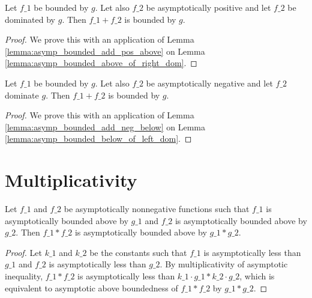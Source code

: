 \begin{lemma}
    \label{lemma:asymp_bounded_add_pos_right_dom}
    \leanok
    Let $f\_1$ be bounded by $g$. Let also $f\_2$ be asymptotically positive and
    let $f\_2$ be dominated by $g$. Then $f\_1 + f\_2$ is bounded by $g$.
\end{lemma}

\begin{proof}
    \leanok
    We prove this with an application of Lemma \ref{lemma:asymp_bounded_add_pos_above}
    on Lemma \ref{lemma:asymp_bounded_above_of_right_dom}.
\end{proof}

\begin{lemma}
    \label{lemma:asymp_bounded_add_neg_left_dom}
    \leanok
    Let $f\_1$ be bounded by $g$. Let also $f\_2$ be asymptotically negative and
    let $f\_2$ dominate $g$. Then $f\_1 + f\_2$ is bounded by $g$.
\end{lemma}

\begin{proof}
    \leanok
    We prove this with an application of Lemma \ref{lemma:asymp_bounded_add_neg_below}
    on Lemma \ref{lemma:asymp_bounded_below_of_left_dom}.
\end{proof}


\section{Multiplicativity}

\begin{lemma}
    \label{lemma:asymp_bounded_above_nonneg_mul}
    \leanok
    Let $f\_1$ and $f\_2$ be asymptotically nonnegative functions such that $f\_1$ 
    is asymptotically bounded above by $g\_1$ and $f\_2$ is asymptotically bounded 
    above by $g\_2$. Then $f\_1 * f\_2$ is asymptotically bounded above by $g\_1 * g\_2$.
\end{lemma}

\begin{proof}
    \leanok
    Let $k\_1$ and $k\_2$ be the constants such that $f\_1$ is asymptotically less than
    $g\_1$ and $f\_2$ is asymptotically less than $g\_2$. By multiplicativity of asymptotic 
    inequality, $f\_1 * f\_2$ is asymptotically less than $k\_1 \cdot g\_1 * k\_2 \cdot g\_2$,
    which is equivalent to asymptotic above boundedness of $f\_1 * f\_2$ by $g\_1 * g\_2$.
\end{proof}

